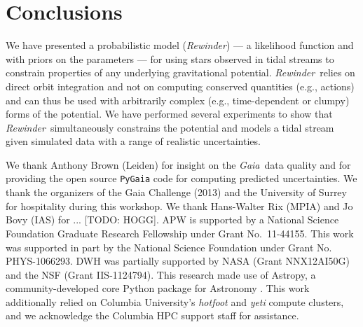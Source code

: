 \documentclass[letterpaper,12pt,preprint]{aastex}
\newcommand{\project}[1]{\textsl{#1}}
\newcommand{\gaia}{\project{Gaia}}
\newcommand{\rewinder}{\emph{Rewinder}}
\begin{document}

\section{Conclusions}
We have presented a probabilistic model (\rewinder) --- a likelihood function and with priors on the parameters --- for using stars observed in tidal streams to constrain properties of any underlying gravitational potential. \rewinder\ relies on direct orbit integration and not on computing conserved quantities (e.g., actions) and can thus be used with arbitrarily complex (e.g., time-dependent or clumpy) forms of the potential. We have performed several experiments to show that \rewinder\ simultaneously constrains the potential and models a tidal stream given simulated data with a range of realistic uncertainties. 

\acknowledgements
We thank Anthony Brown (Leiden) for insight on the \gaia\, data quality and for providing the open source \texttt{PyGaia} code for computing predicted uncertainties. We thank the organizers of the Gaia Challenge (2013) and the University of Surrey for hospitality during this workshop. We thank Hans-Walter Rix (MPIA) and Jo Bovy (IAS) for ... [TODO: HOGG].
APW is supported by a National Science Foundation Graduate Research Fellowship under Grant No.\ 11-44155. This work was supported in part by the National Science Foundation under Grant No. PHYS-1066293. 
DWH was partially supported by NASA (Grant NNX12AI50G) and the NSF (Grant IIS-1124794).
This research made use of Astropy, a community-developed core Python package for Astronomy \citep{astropy13}.
This work additionally relied on Columbia University's \emph{hotfoot} and \emph{yeti} compute clusters, and we acknowledge the Columbia HPC support staff for assistance. \\



\end{document}
